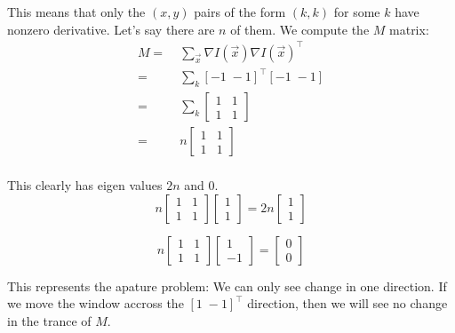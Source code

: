 \documentclass[11pt,english]{article}
\begin{document}
\begin{enumerate}
This means that only the $(x,y)$ pairs of the form $(k,k)$ for some $k$ have nonzero derivative. Let's say
there are $n$ of them. We compute the
$M$ matrix:
\begin{align*}
M 
=&\; \sum_{\vec{x}} \nabla I(\vec{x}) \nabla I(\vec{x})^\top \\
=&\; \sum_{k} [-1 \; -1 ]^\top [ -1 \; -1 ]  \\
=&\; \sum_{k}
        \begin{bmatrix}
           1 & 1 \\
           1 & 1 
        \end{bmatrix} \\
=&\; n  \begin{bmatrix}
           1 & 1 \\
           1 & 1 
        \end{bmatrix} \\
\end{align*}

This clearly has eigen values $2n$ and $0$.
\[
n \begin{bmatrix}
           1 & 1 \\
           1 & 1 
   \end{bmatrix} 
 \begin{bmatrix}
           1  \\
           1  
   \end{bmatrix} =
 2n \begin{bmatrix}
           1  \\
           1  
   \end{bmatrix} 
\]

\[
n \begin{bmatrix}
           1 & 1 \\
           1 & 1 
   \end{bmatrix} 
 \begin{bmatrix}
           1  \\
          -1  
   \end{bmatrix} =
   \begin{bmatrix}
           0  \\
           0  
   \end{bmatrix} 
\]

This represents the apature problem: We can only see change in one direction. If we move the window accross the
$[ 1 \; -1 ]^\top$ direction, then we will see no change in the trance of $M$. 


\end{enumerate}
\end{document}
